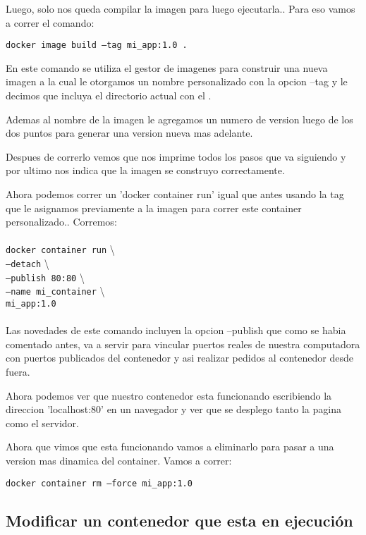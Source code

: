 \documentclass[11pt]{article} %
\begin{document}
Luego, solo nos queda compilar la imagen para luego ejecutarla.. Para eso vamos a correr el comando:
\begin{center}
	\texttt{docker image build --tag mi\_app:1.0 .}
\end{center}

En este comando se utiliza el gestor de imagenes para construir una nueva imagen a la cual le otorgamos un nombre personalizado con la opcion --tag y le decimos que incluya el directorio actual con el .

Ademas al nombre de la imagen le agregamos un numero de version luego de los dos puntos para generar una version nueva mas adelante.

Despues de correrlo vemos que nos imprime todos los pasos que va siguiendo y por ultimo nos indica que la imagen se construyo correctamente.

Ahora podemos correr un 'docker container run' igual que antes usando la tag que le asignamos previamente a la imagen para correr este container personalizado.. Corremos: \\ \\
	\texttt{docker container run} \textbackslash \\
	\texttt{--detach} \textbackslash \\
	\texttt{--publish 80:80} \textbackslash \\
	\texttt{--name mi\_container} \textbackslash \\
	\texttt{mi\_app:1.0} \\ \\

Las novedades de este comando incluyen la opcion --publish que como se habia comentado antes, va a servir para vincular puertos reales de nuestra computadora con puertos publicados del contenedor y asi realizar pedidos al contenedor desde fuera.

Ahora podemos ver que nuestro contenedor esta funcionando escribiendo la direccion 'localhost:80' en un navegador y ver que se desplego tanto la pagina como el servidor.

Ahora que vimos que esta funcionando vamos a eliminarlo para pasar a una version mas dinamica del container. Vamos a correr:
\begin{center}
	\texttt{docker container rm --force mi\_app:1.0}
\end{center}

\subsection{Modificar un contenedor que esta en ejecución}
\end{document}
